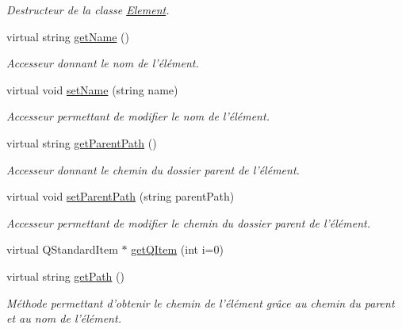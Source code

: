 \begin{DoxyCompactItemize}
\begin{DoxyCompactList}\small\item\em Destructeur de la classe \hyperlink{class_element}{Element}. \item\end{DoxyCompactList}\item 
virtual string \hyperlink{class_element_a27a65299407f69ef9d4ae0525039c151}{getName} ()
\begin{DoxyCompactList}\small\item\em Accesseur donnant le nom de l'élément. \item\end{DoxyCompactList}\item 
virtual void \hyperlink{class_element_ac32d5701b8eb276aa176eeb73ac650b2}{setName} (string name)
\begin{DoxyCompactList}\small\item\em Accesseur permettant de modifier le nom de l'élément. \item\end{DoxyCompactList}\item 
virtual string \hyperlink{class_element_ae69c61bab74ebca485225e8d3a1fff95}{getParentPath} ()
\begin{DoxyCompactList}\small\item\em Accesseur donnant le chemin du dossier parent de l'élément. \item\end{DoxyCompactList}\item 
virtual void \hyperlink{class_element_a4f9a0fe4b81444822fb709bd1c063d52}{setParentPath} (string parentPath)
\begin{DoxyCompactList}\small\item\em Accesseur permettant de modifier le chemin du dossier parent de l'élément. \item\end{DoxyCompactList}\item 
virtual QStandardItem $\ast$ \hyperlink{class_element_a86dd6112e04340382cbe9e8d761a1de1}{getQItem} (int i=0)
\item 
virtual string \hyperlink{class_element_a299a6beb0d110b931e4cadbb193f80cd}{getPath} ()
\begin{DoxyCompactList}\small\item\em Méthode permettant d'obtenir le chemin de l'élément grâce au chemin du parent et au nom de l'élément. \item\end{DoxyCompactList}\item 

\end{DoxyCompactItemize}
